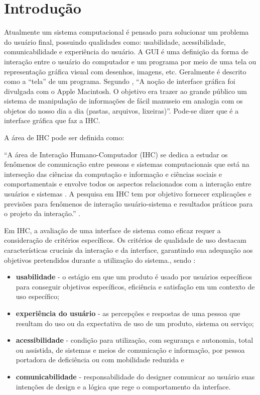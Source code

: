 \chapter[Introdução]{Introdução}
\label{capIntro}

Atualmente um sistema computacional é pensado para solucionar um problema do usuário final, possuindo qualidades como: usabilidade, acessibilidade, comunicabilidade e experiência do usuário. A \ac{GUI} é uma definição da forma de interação entre o usuário do computador e um programa por meio de uma tela ou representação gráfica visual com desenhos, imagens, etc. Geralmente é descrito como a “tela” de um programa. Segundo , “A noção de interface gráfica foi divulgada com o Apple Macintosh. O objetivo era trazer ao grande público um sistema de manipulação de informações de fácil manuseio em analogia com os objetos do nosso dia a dia (pastas, arquivos, lixeiras)”.
Pode-se dizer que é a interface gráfica que faz a \ac{IHC}.

A área de \ac{IHC} pode ser definida como:
 \begin{citacao}
“A área de Interação Humano-Computador (\acs{IHC}) se dedica a estudar os fenômenos de comunicação entre pessoas e sistemas computacionais que está na interseção das ciências da computação e informação e ciências sociais e comportamentais e envolve todos os aspectos relacionados com a interação entre usuários e sistemas . A pesquisa em \acs{IHC} tem por objetivo fornecer explicações e previsões para fenômenos de interação usuário-sistema e resultados práticos para o projeto da interação.” \cite{sbcihc}.
\end{citacao}


Em \acs{IHC}, a avaliação de uma interface de sistema como eficaz requer a consideração de critérios específicos. Os critérios de qualidade de uso destacam características cruciais da interação e da interface, garantindo sua adequação aos objetivos pretendidos durante a utilização do sistema., sendo \cite{barbosa2010interaccao}:
\begin{itemize}
    \item \textbf{usabilidade} - o estágio em que um produto é usado por usuários específicos para conseguir objetivos específicos, eficiência e satisfação em um contexto de uso específico;
    \item \textbf{experiência do usuário} - as percepções e respostas de uma pessoa que resultam do uso ou da expectativa de uso de um produto, sistema ou serviço;
    \item \textbf{acessibilidade} - condição para utilização, com segurança e autonomia, total ou assistida, de sistemas e meios de comunicação e informação, por pessoa portadora de deficiência ou com mobilidade reduzida e
    \item \textbf{comunicabilidade} - responsabilidade do designer comunicar ao usuário suas intenções de design e a lógica que rege o comportamento da interface.
\end{itemize}

